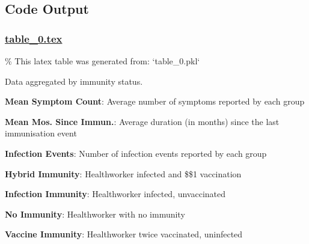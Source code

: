 \documentclass[11pt]{article}
\begin{document}
\subsection{Code Output}

\subsubsection*{\hyperlink{code-LaTeX Table Design-table-0-tex}{table\_0.tex}}

\begin{codeoutput}
\% This latex table was generated from: `table\_0.pkl`
\begin{table}[h]
\caption{Summary Statistics of Infection Events, Mean Symptoms and Months Since Last Immunisation}
\label{table:summary\_stats}
\begin{threeparttable}
\renewcommand{\TPTminimum}{\linewidth}
\begin{tablenotes}
\footnotesize
\item Data aggregated by immunity status.
\item \textbf{Mean Symptom Count}: Average number of symptoms reported by each group
\item \textbf{Mean Mos. Since Immun.}: Average duration (in months) since the last immunisation event
\item \textbf{Infection Events}: Number of infection events reported by each group
\item \textbf{Hybrid Immunity}: Healthworker infected and \$\geq\$1 vaccination
\item \textbf{Infection Immunity}: Healthworker infected, unvaccinated
\item \textbf{No Immunity}: Healthworker with no immunity
\item \textbf{Vaccine Immunity}: Healthworker twice vaccinated, uninfected
\end{tablenotes}
\end{threeparttable}
\end{table}
\end{codeoutput}
\end{document}
